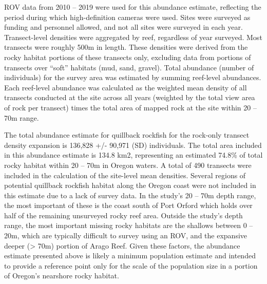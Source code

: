 \documentclass[11pt,
  english,
  a4paper,
]{article}
\begin{document}
\leavevmode\tagmcend\tagstructend\par


ROV data from 2010 -- 2019 were used for this abundance estimate, reflecting the period during which high-definition cameras were used. Sites were surveyed as funding and personnel allowed, and not all sites were surveyed in each year. Transect-level densities were aggregated by reef, regardless of year surveyed. Most transects were roughly 500m in length. These densities were derived from the rocky habitat portions of these transects only, excluding data from portions of transects over ``soft'' habitats (mud, sand, gravel). Total abundance (number of individuals) for the survey area was estimated by summing reef-level abundances. Each reef-level abundance was calculated as the weighted mean density of all transects conducted at the site across all years (weighted by the total view area of rock per transect) times the total area of mapped rock at the site within 20 -- 70m range.

\leavevmode\tagmcend\tagstructend\par


The total abundance estimate for quillback rockfish for the rock-only transect density expansion is 136,828 +/- 90,971 (SD) individuals. The total area included in this abundance estimate is 134.8 km2, representing an estimated 74.8\% of total rocky habitat within 20 -- 70m in Oregon waters. A total of 490 transects were included in the calculation of the site-level mean densities. Several regions of potential quillback rockfish habitat along the Oregon coast were not included in this estimate due to a lack of survey data. In the study's 20 -- 70m depth range, the most important of these is the coast south of Port Orford which holds over half of the remaining unsurveyed rocky reef area. Outside the study's depth range, the most important missing rocky habitats are the shallows between 0 -- 20m, which are typically difficult to survey using an ROV, and the expansive deeper (\textgreater{} 70m) portion of Arago Reef. Given these factors, the abundance estimate presented above is likely a minimum population estimate and intended to provide a reference point only for the scale of the population size in a portion of Oregon's nearshore rocky habitat.

\leavevmode\tagmcend\tagstructend\par
\end{document}
